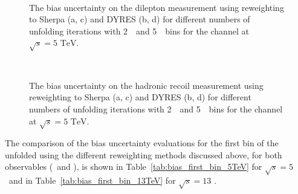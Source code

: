 \begin{figure}[h]
\centering
{}
\\
\caption{The bias uncertainty on the dilepton \pt measurement using reweighting to Sherpa (a, c) and DYRES (b, d) for different numbers of unfolding iterations with 2~\GeV\ and 5~\GeV\ bins for the \Zee channel at $\sqrt{s} = 5 \textrm{ TeV}$.}
\label{fig:bias_pt_predictions}
\end{figure}
\begin{figure}[h]
\centering
{}
\\
\caption{The bias uncertainty on the hadronic recoil measurement using reweighting to Sherpa (a, c) and DYRES (b, d) for different numbers of unfolding iterations with 2~\GeV\ and 5~\GeV\ bins for the \Zee channel at $\sqrt{s} = 5 \textrm{ TeV}$.}
\label{fig:bias_ut_predictions}
\end{figure}

The comparison of the bias uncertainty evaluations for the first bin of the unfolded \ptz using the different reweighting methods discussed above, for both observables (\ptdilep\ and \ut), is shown in Table~\ref{tab:bias_first_bin_5TeV} for $\sqrt{s} = 5$ \TeV\ and in Table~\ref{tab:bias_first_bin_13TeV} for $\sqrt{s} = 13$ \TeV.


